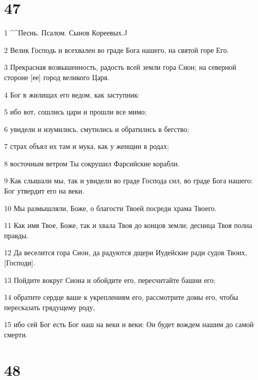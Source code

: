 \chapter{47}

\par 1 ^^Песнь. Псалом. Сынов Кореевых.^^
\par 2 Велик Господь и всехвален во граде Бога нашего, на святой горе Его.
\par 3 Прекрасная возвышенность, радость всей земли гора Сион; на северной стороне [ее] город великого Царя.
\par 4 Бог в жилищах его ведом, как заступник:
\par 5 ибо вот, сошлись цари и прошли все мимо;
\par 6 увидели и изумились, смутились и обратились в бегство;
\par 7 страх объял их там и мука, как у женщин в родах;
\par 8 восточным ветром Ты сокрушил Фарсийские корабли.
\par 9 Как слышали мы, так и увидели во граде Господа сил, во граде Бога нашего: Бог утвердит его на веки.
\par 10 Мы размышляли, Боже, о благости Твоей посреди храма Твоего.
\par 11 Как имя Твое, Боже, так и хвала Твоя до концов земли; десница Твоя полна правды.
\par 12 Да веселится гора Сион, да радуются дщери Иудейские ради судов Твоих, [Господи].
\par 13 Пойдите вокруг Сиона и обойдите его, пересчитайте башни его;
\par 14 обратите сердце ваше к укреплениям его, рассмотрите домы его, чтобы пересказать грядущему роду,
\par 15 ибо сей Бог есть Бог наш на веки и веки: Он будет вождем нашим до самой смерти.

\chapter{48}

